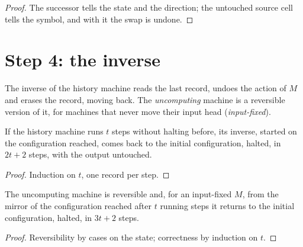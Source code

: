 \begin{proof}
  \leanok
  The successor tells the state and the direction; the untouched source cell tells the symbol, and
  with it the swap is undone.
\end{proof}

\section{Step 4: the inverse}

\begin{definition}
  \label{def:invTM}
  \leanok
  The inverse of the history machine reads the last record, undoes the action of $M$ and erases the
  record, moving back. The \emph{uncomputing} machine is a reversible version of it, for machines
  that never move their input head (\emph{input-fixed}).
\end{definition}

\begin{theorem}
  \label{thm:inverse}
  \leanok
  If the history machine runs $t$ steps without halting before, its inverse, started on the
  configuration reached, comes back to the initial configuration, halted, in $2t + 2$ steps, with
  the output untouched.
\end{theorem}

\begin{proof}
  \leanok
  Induction on $t$, one record per step.
\end{proof}

\begin{theorem}
  \label{thm:uncompute}
  \leanok
  The uncomputing machine is reversible and, for an input-fixed $M$, from the mirror of the
  configuration reached after $t$ running steps it returns to the initial configuration, halted, in
  $3t + 2$ steps.
\end{theorem}

\begin{proof}
  \leanok
  Reversibility by cases on the state; correctness by induction on $t$.
\end{proof}

